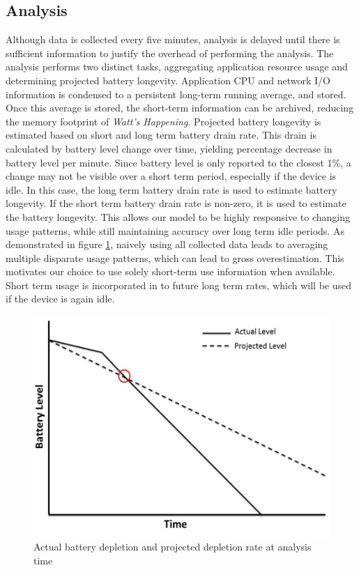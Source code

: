 \subsection{Analysis}
\label{subsec:impl_analysis}
Although data is collected every five minutes, analysis is delayed until there is sufficient information to justify the overhead of performing the analysis.
The analysis performs two distinct tasks, aggregating application resource usage and determining projected battery longevity.
Application CPU and network I/O information is condensed to a persistent long-term running average, and stored.
Once this average is stored, the short-term information can be archived, reducing the memory footprint of \emph{Watt's Happening}.
Projected battery longevity is estimated based on short and long term battery drain rate.
This drain is calculated by battery level change over time, yielding  percentage decrease in battery level per minute. 
Since battery level is only reported to the closest 1\%, a change may not be visible over a short term period, especially if the device is idle.
In this case, the long term battery drain rate is used to estimate battery longevity.  
If the short term battery drain rate is non-zero, it is used to estimate the battery longevity.
This allows our model to be highly responsive to changing usage patterns, while still maintaining accuracy over long term idle periods.
As demonstrated in figure \ref{fig:bat_v_time}, naively using all collected data leads to averaging multiple disparate usage patterns, which can lead to gross overestimation.  
This motivates our choice to use solely short-term use information when available.
Short term usage is incorporated in to future long term rates, which will be used if the device is again idle.
\begin{figure}[ht!]
	\begin{center}
		\includegraphics[width=\columnwidth]{figs/bat_vs_time.png}
		\caption{Actual battery depletion and projected depletion rate at analysis time}
		\label{fig:bat_v_time}
\end{center}
\end{figure}
% 

